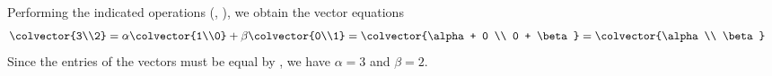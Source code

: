Performing the indicated operations (, ), we obtain the vector equations
\begin{align*}
\colvector{3\\2} 
&=\alpha\colvector{1\\0} + \beta\colvector{0\\1} 
=\colvector{\alpha + 0 \\ 0 + \beta} 
=\colvector{\alpha\\ \beta}
\end{align*}
Since the entries of the vectors must be equal by , we have $\alpha = 3$ and $\beta = 2$.
